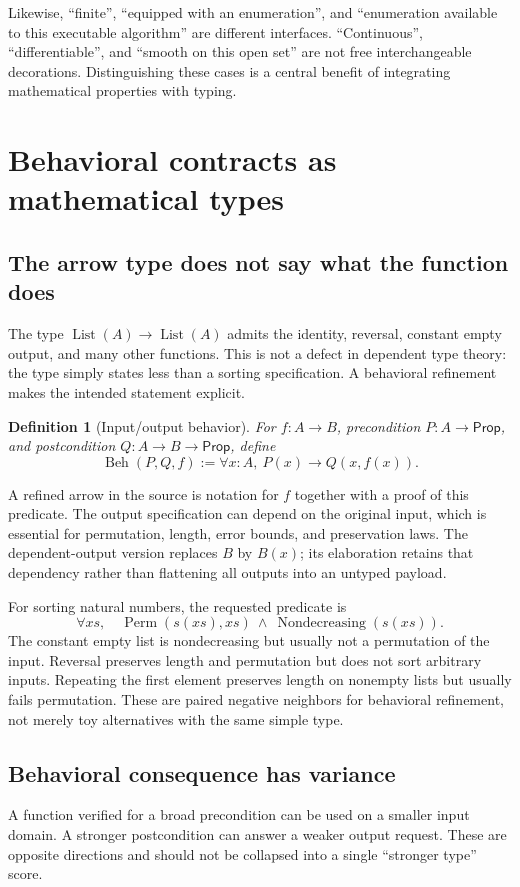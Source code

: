 \documentclass[11pt,letterpaper]{article}
\newcommand{\Prop}{\mathsf{Prop}}
\newtheorem{definition}{Definition}[section]
\theoremstyle{remark}
\begin{document}
Likewise, ``finite'', ``equipped with an enumeration'', and ``enumeration
available to this executable algorithm'' are different interfaces.
``Continuous'', ``differentiable'', and ``smooth on this open set'' are
not free interchangeable decorations. Distinguishing these cases is a central
benefit of integrating mathematical properties with typing.

\section{Behavioral contracts as mathematical types}\label{sec:behavior}

\subsection{The arrow type does not say what the function does}
The type $\operatorname{List}(A)\to\operatorname{List}(A)$ admits the identity,
reversal, constant empty output, and many other functions. This is not a defect
in dependent type theory: the type simply states less than a sorting
specification. A behavioral refinement makes the intended statement explicit.

\begin{definition}[Input/output behavior]
For $f:A\to B$, precondition $P:A\to\Prop$, and postcondition
$Q:A\to B\to\Prop$, define
\[
 \operatorname{Beh}(P,Q,f)
   :=\forall x:A,\ P(x)\to Q(x,f(x)).
\]
\end{definition}

A refined arrow in the source is notation for $f$ together with a proof of this
predicate. The output specification can depend on the original input, which
is essential for permutation, length, error bounds, and preservation laws.
The dependent-output version replaces $B$ by $B(x)$; its elaboration retains
that dependency rather than flattening all outputs into an untyped payload.

For sorting natural numbers, the requested predicate is
\[
 \forall xs,\quad
  \operatorname{Perm}(s(xs),xs)\ \land\
  \operatorname{Nondecreasing}(s(xs)).
\]
The constant empty list is nondecreasing but usually not a permutation of the
input. Reversal preserves length and permutation but does not sort arbitrary
inputs. Repeating the first element preserves length on nonempty lists but
usually fails permutation. These are paired negative neighbors for behavioral
refinement, not merely toy alternatives with the same simple type.

\subsection{Behavioral consequence has variance}
A function verified for a broad precondition can be used on a smaller input
domain. A stronger postcondition can answer a weaker output request. These
are opposite directions and should not be collapsed into a single ``stronger
type'' score.
\end{document}
